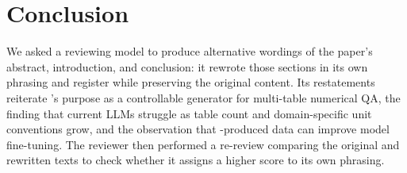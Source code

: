 \section{Conclusion} 
We asked a reviewing model to produce alternative wordings of the paper's abstract, introduction, and conclusion: it rewrote those sections in its own phrasing and register while preserving the original content. Its restatements reiterate \name's purpose as a controllable generator for multi-table numerical QA, the finding that current LLMs struggle as table count and domain-specific unit conventions grow, and the observation that \name-produced data can improve model fine-tuning. The reviewer then performed a re-review comparing the original and rewritten texts to check whether it assigns a higher score to its own phrasing. 
